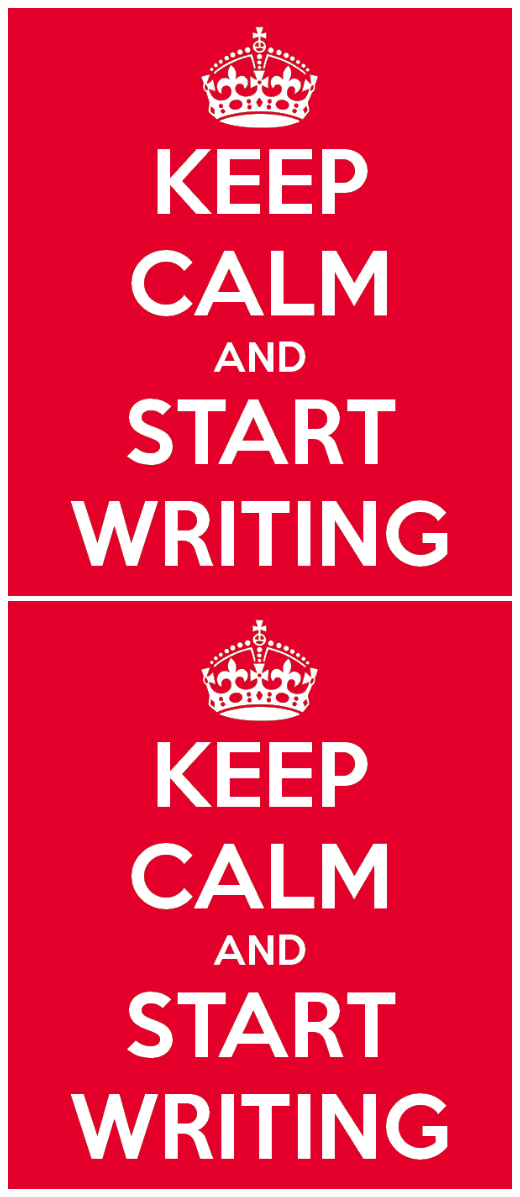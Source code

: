 \includegraphics[scale=0.3]{obrazky-figures/keep-calm.png}
\includegraphics[scale=0.3]{obrazky-figures/keep-calm.png}

